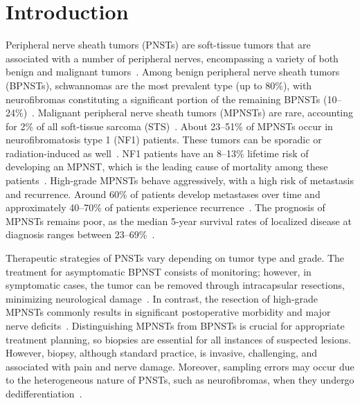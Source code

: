 \section{Introduction}
Peripheral nerve sheath tumors (PNSTs) are soft-tissue tumors that are associated with a number of peripheral nerves, encompassing a variety of both benign and malignant tumors~\autocite{levi2010}.
Among benign peripheral nerve sheath tumors (BPNSTs), schwannomas are the most prevalent type (up to 80\%), with neurofibromas constituting a significant portion of the remaining BPNSTs (10--24\%)~\autocite{martin2021,jack2021}.
Malignant peripheral nerve sheath tumors (MPNSTs) are rare, accounting for 2\% of all soft-tissue sarcoma (STS)~\autocite{ng2013}.
About 23--51\% of MPNSTs occur in neurofibromatosis type 1 (NF1) patients.
These tumors can be sporadic or radiation-induced as well~\autocite{zou2009,stucky2012,anghileri2006,miao2019}.
NF1 patients have an 8--13\% lifetime risk of developing an MPNST, which is the leading cause of mortality among these patients~\autocite{evans2002,ferner2007}.
High-grade MPNSTs behave aggressively, with a high risk of metastasis and recurrence.
Around 60\% of patients develop metastases over time and approximately 40--70\% of patients experience recurrence~\autocite{zou2009,stucky2012,anghileri2006,wong1998,zehou2013,james2016,hagi2016,stark2001,akshintala2023,sobczuk2020,yamaguchi2003}.
The prognosis of MPNSTs remains poor, as the median 5-year survival rates of localized disease at diagnosis ranges between 23--69\%~\autocite{valentin2016}.

Therapeutic strategies of PNSTs vary depending on tumor type and grade.
The treatment for asymptomatic BPNST consists of monitoring; however, in symptomatic cases, the tumor can be removed through intracapsular resections, minimizing neurological damage~\autocite{nelson2020,hajiabadi2020}.
In contrast, the resection of high-grade MPNSTs commonly results in significant postoperative morbidity and major nerve deficits~\autocite{dunn2013}.
Distinguishing MPNSTs from BPNSTs is crucial for appropriate treatment planning, so biopsies are essential for all instances of suspected lesions.
However, biopsy, although standard practice, is invasive, challenging, and associated with pain and nerve damage.
Moreover, sampling errors may occur due to the heterogeneous nature of PNSTs, such as neurofibromas, when they undergo dedifferentiation~\autocite{graham2019}.

